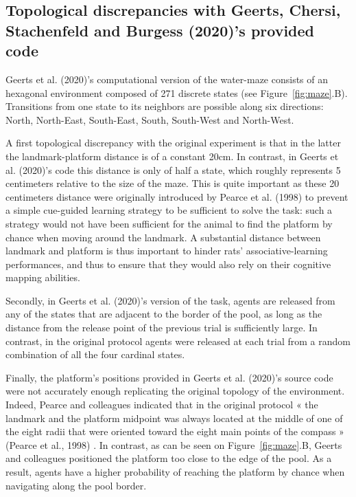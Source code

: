 \subsection{Topological discrepancies with Geerts, Chersi, Stachenfeld and Burgess (2020)'s provided code}
Geerts et al. (2020)'s computational version of the water-maze consists of an hexagonal environment composed of 271 discrete states (see Figure~\ref{fig:maze}.B). Transitions from one state to its neighbors are possible along six directions: North, North-East, South-East, South, South-West and North-West. 

A first topological discrepancy with the original experiment is that in the latter the landmark-platform distance is of a constant 20cm. In contrast, in Geerts et al. (2020)’s code this distance is only of half a state, which roughly represents 5 centimeters relative to the size of the maze. This is quite important as these 20 centimeters distance were originally introduced by Pearce et al. (1998) to prevent a simple cue-guided learning strategy to be sufficient to solve the task: such a strategy would not have been sufficient for the animal to find the platform by chance when moving around the landmark. A substantial distance between landmark and platform is thus important to hinder rats’ associative-learning performances, and thus to ensure that they would also rely on their cognitive mapping abilities. 

Secondly, in Geerts et al. (2020)’s version of the task, agents are released from any of the states that are adjacent to the border of the pool, as long as the distance from the release point of the previous trial is sufficiently large. In contrast, in the original protocol agents were released at each trial from a random combination of all the four cardinal states.

Finally, the platform's positions provided in Geerts et al. (2020)’s source code were not accurately enough replicating the original topology of the environment. Indeed, Pearce and colleagues indicated that in the original protocol « the landmark and the platform midpoint was always located at the middle of one of the eight radii that were oriented toward the eight main points of the compass » (Pearce et al., 1998) \cite{Pearce:1998}. In contrast, as can be seen on Figure~\ref{fig:maze}.B, Geerts and colleagues positioned the platform too close to the edge of the pool. As a result, agents have a higher probability of reaching the platform by chance when navigating along the pool border.

